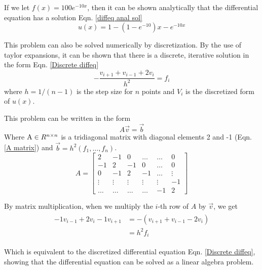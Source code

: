 \documentclass[10pt,showpacs,preprintnumbers,footinbib,amsmath,amssymb,aps,prl,twocolumn,groupedaddress,superscriptaddress,showkeys]{revtex4-1}
\begin{document}
  If we let $f(x) = 100e^{-10x}$, then it can be shown analytically that the differential equation has a solution Eqn. \ref{diffeq anal sol}
  \begin{equation}
    \label{diffeq anal sol}
    u(x) = 1 - (1 - e^{-10})x - e^{-10x}
  \end{equation}

  This problem can also be solved numerically by discretization. By the use of taylor expansions, it can be shown that there is a discrete, iterative solution in the form Eqn. \ref{Discrete diffeq} \cite{lecture_notes}
  \begin{equation}
    \label{Discrete diffeq}
    - \frac{v_{i+1} + v_{i-1} + 2v_i}{h^2} = f_i
  \end{equation}
  where $h = 1/(n-1)$ is the step size for $n$ points and $V_i$ is the discretized form of $u(x)$.

  This problem can be written in the form 
  \begin{equation}
    A\vec v = \vec b
  \end{equation}
  Where $\textup A \in R^{n \times n}$ is a tridiagonal matrix with diagonal elements 2 and -1 (Eqn. \ref{A matrix}) and $\vec b =h^2(f_1, \dots, f_n)$.
  \begin{equation}
    \label{A matrix}
    A = \left[ 
    \begin{matrix}
      2 & -1 & 0 & \dots  & \dots &0 \\
      -1 & 2 & -1 & 0 & \dots &  0 \\
      0 & -1 & 2 & -1 & \dots & \vdots  \\
      \vdots & \vdots & \vdots & \vdots & \vdots & -1\\
      \dots & \dots & \dots & \dots & -1 & 2
    \end{matrix}
    \right]
  \end{equation}

  By matrix multiplication, when we multiply   the $i$-th row of $A$ by $\vec v$, we get
  \begin{align}
  \begin{split}
 -1 v_{i -1} + 2v_i - 1v_{i+1}  &= -\left( v_{i+1} + v_{i-1} - 2v_i\right) 
                                \\&= h^2f_i
  \end{split}
  \end{align}

  Which is equivalent to the discretized differential equation Eqn. \ref{Discrete diffeq},
  showing that the differential equation can be solved as a linear algebra problem. 
\end{document}
